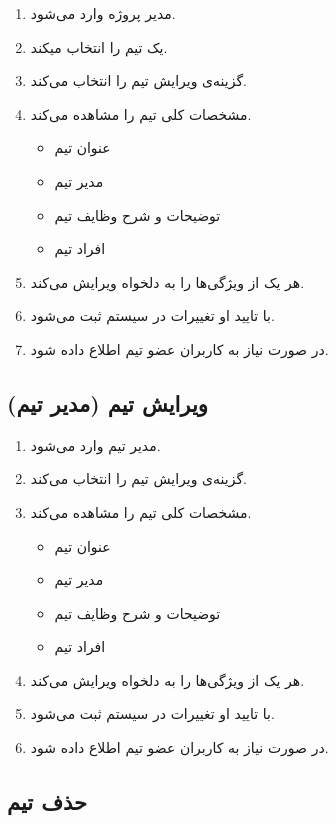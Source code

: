 \documentclass[10pt,a4paper]{article}
\begin{document}
\begin{enumerate}
	\item 
	مدیر پروژه وارد می‌شود.
	\item
	یک تیم را انتخاب میکند.
	\item
	گزینه‌ی ویرایش تیم را انتخاب می‌کند.
	\item
	مشخصات کلی تیم را مشاهده می‌کند.
	\begin{itemize}
		\item 
		عنوان تیم 
		\item
		مدیر تیم
		\item
		توضیحات و شرح وظایف تیم
		\item
		افراد تیم 
	\end{itemize}
	\item
	هر یک از ويژگی‌ها را به دلخواه ویرایش می‌کند.
	\item
	با تایید او تغییرات در سیستم ثبت می‌شود.
	\item
	در صورت نیاز به کاربران عضو تیم اطلاع داده شود.
	
\end{enumerate}


\subsection{
	ویرایش تیم (مدیر تیم)
}

\begin{enumerate}
	\item 
	مدیر تیم وارد می‌شود.
	\item
	گزینه‌ی ویرایش تیم را انتخاب می‌کند.
	\item
	مشخصات کلی تیم را مشاهده می‌کند.
	\begin{itemize}
		\item 
		عنوان تیم 
		\item
		مدیر تیم
		\item
		توضیحات و شرح وظایف تیم
		\item
		افراد تیم 
	\end{itemize}
	\item
	هر یک از ويژگی‌ها را به دلخواه ویرایش می‌کند.
	\item
	با تایید او تغییرات در سیستم ثبت می‌شود.
	\item
	در صورت نیاز به کاربران عضو تیم اطلاع داده شود.
	
\end{enumerate}

\subsection{
حذف تیم
}
\end{document}
